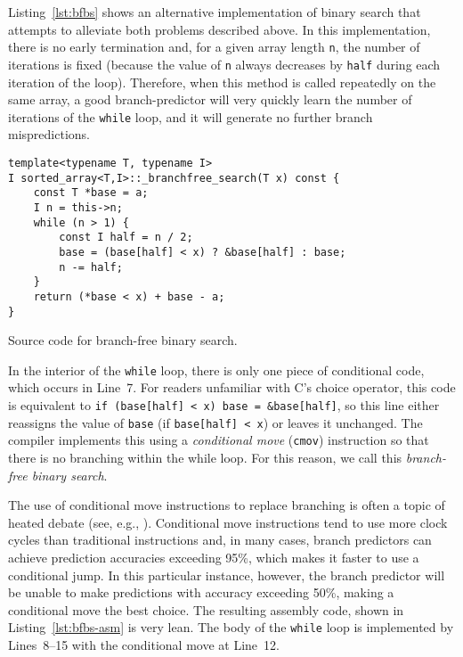 \documentclass{patmorin}
\newcommand{\lstlabel}[1]{\label{lst:#1}}
\newcommand{\lstref}[1]{Listing~\ref{lst:#1}}
\newcommand{\Lstref}[1]{\lstref{#1}}
\begin{document}
\Lstref{bfbs} shows an alternative implementation of binary search
that attempts to alleviate both problems described above.  In this
implementation, there is no early termination and, for a given array
length \texttt{n}, the number of iterations is fixed (because the
value of \texttt{n} always decreases by \texttt{half}
during each iteration of the loop).  Therefore, when this method is
called repeatedly on the same array, a good branch-predictor will very
quickly learn the number of iterations of the \texttt{while}
loop, and it will generate no further branch mispredictions.

\begin{listing}
\begin{verbatim}
template<typename T, typename I>
I sorted_array<T,I>::_branchfree_search(T x) const {
    const T *base = a;
    I n = this->n;
    while (n > 1) {
        const I half = n / 2;
        base = (base[half] < x) ? &base[half] : base;
        n -= half;
    }
    return (*base < x) + base - a;
}
\end{verbatim}
\caption{Source code for branch-free binary search.}
\lstlabel{bfbs}
\end{listing}

In the interior of the \texttt{while} loop, there is only one
piece of conditional code, which occurs in Line~7.  For readers unfamiliar
with C's choice operator, this code is equivalent to \texttt{if
(base[half] < x) base = &base[half]}, so this line either reassigns
the value of \texttt{base} (if \texttt{base[half]
< x}) or leaves it unchanged.  The compiler implements this using a
\emph{conditional move} (\texttt{cmov}) instruction so that
there is no branching within the while loop.  For this reason, we call
this \emph{branch-free binary search}.

The use of conditional move instructions to replace branching is often a
topic of heated debate (see, e.g., \cite{torvalds:cmov}).  Conditional
move instructions tend to use more clock cycles than traditional
instructions and, in many cases, branch predictors can achieve prediction
accuracies exceeding 95\%, which makes it faster to use a conditional
jump.  In this particular instance, however, the branch predictor will
be unable to make predictions with accuracy exceeding 50\%, making a
conditional move the best choice.  The resulting assembly code, shown in
\lstref{bfbs-asm} is very lean.  The body of the \texttt{while}
loop is implemented by Lines~8--15 with the conditional move at Line~12.
\end{document}
